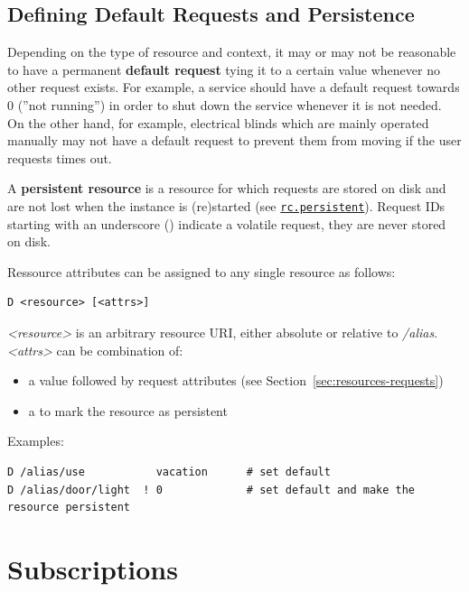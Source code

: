 \documentclass[12pt,english,parskip=half,headheight=19pt]{scrreprt}
\newcommand{\lst}[1]{\colorbox{lstbackground}{\footnotesize\code{#1}}}
\newcommand{\idx}[1]{#1\index{#1}}
\newcommand{\refenv}[1]{\hyperref[env:#1]{\texttt{#1}}}        %
\begin{document}
\subsection{Defining Default Requests and Persistence}
\label{sec:resources-conf-defaults}

Depending on the type of resource and context, it may or may not be reasonable to have a permanent \textbf{default request} tying it to a certain value whenever no other request exists. For example, a service should have a default request towards 0 (''not running'') in order to shut down the service whenever it is not needed. On the other hand, for example, electrical blinds which are mainly operated manually may not have a default request to prevent them from moving if the user requests times out.

A \textbf{persistent resource} is a resource for which requests are stored on disk and are not lost when the instance is (re)started (see \refenv{rc.persistent}). Request IDs starting with an underscore (\lst{\_}) indicate a volatile request, they are never stored on disk.

Ressource attributes can be assigned to any single resource as follows:
\begin{lstlisting}
D <resource> [<attrs>]
\end{lstlisting}

\textit{<resource>} is an arbitrary resource URI, either absolute or relative to \textit{/alias}. \textit{<attrs>} can be combination of:
\begin{itemize}
  \item a value followed by request attributes (see Section~\ref{sec:resources-requests})
  \item a \lst{!} to mark the resource as persistent
\end{itemize}

Examples:
\begin{lstlisting}
D /alias/use           vacation      # set default
D /alias/door/light  ! 0             # set default and make the resource persistent
\end{lstlisting}





\section{Subscriptions}
\label{sec:resources-subscriptions}
\end{document}
